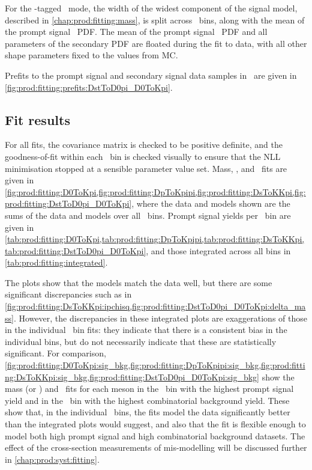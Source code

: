 For the \PDstarp-tagged \DzToKpi\ mode, the width of the widest component of 
the signal model, described in \cref{chap:prod:fitting:mass}, is split across 
\pTy\ bins, along with the mean of the prompt signal \lnipchisq\ \ac{PDF}.
The mean of the prompt signal \lnipchisq\ \ac{PDF} and all parameters of the 
secondary \ac{PDF} are floated during the fit to data, with all other shape 
parameters fixed to the values from \ac{MC}.

Prefits to the prompt signal and secondary signal data samples in \PDzero 
\lnipchisq\ are given in \cref{fig:prod:fitting:prefits:DstToD0pi_D0ToKpi}.

\subsection{Fit results}
\label{chap:prod:fitting:results}

For all fits, the covariance matrix is checked to be positive definite, and the 
goodness-of-fit within each \pTy\ bin is checked visually to ensure that the 
\ac{NLL} minimisation stopped at a sensible parameter value set.
Mass, \deltam, and \lnipchisq\ fits are given in 
\cref{fig:prod:fitting:D0ToKpi,fig:prod:fitting:DpToKpipi,fig:prod:fitting:DsToKKpi,fig:prod:fitting:DstToD0pi_D0ToKpi}, 
where the data and models shown are the sums of the data and models over all 
\pTy\ bins.
Prompt signal yields per \pTy\ bin are given in 
\cref{tab:prod:fitting:D0ToKpi,tab:prod:fitting:DpToKpipi,tab:prod:fitting:DsToKKpi,tab:prod:fitting:DstToD0pi_D0ToKpi}, 
and those integrated across all bins in \cref{tab:prod:fitting:integrated}.

The plots show that the models match the data well, but there are some 
significant discrepancies such as in 
\cref{fig:prod:fitting:DsToKKpi:ipchisq,fig:prod:fitting:DstToD0pi_D0ToKpi:delta_mass}.
However, the discrepancies in these integrated plots are exaggerations of those 
in the individual \pTy\ bin fits: they indicate that there is a consistent bias 
in the individual bins, but do not necessarily indicate that these are 
statistically significant.
For comparison, 
\cref{fig:prod:fitting:D0ToKpi:sig_bkg,fig:prod:fitting:DpToKpipi:sig_bkg,fig:prod:fitting:DsToKKpi:sig_bkg,fig:prod:fitting:DstToD0pi_D0ToKpi:sig_bkg} 
show the mass (or \deltam) and \lnipchisq\ fits for each meson in the \pTy\ bin 
with the highest prompt signal yield and in the \pTy\ bin with the highest 
combinatorial background yield.
These show that, in the individual \pTy\ bins, the fits model the data 
significantly better than the integrated plots would suggest, and also that the 
fit is flexible enough to model both high prompt signal and high combinatorial 
background datasets.
The effect of the cross-section measurements of mis-modelling will be discussed 
further in \cref{chap:prod:syst:fitting}.

